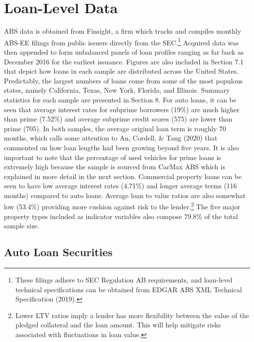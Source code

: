 \documentclass[10.5pt]{article}
\begin{document}
\section{Loan-Level Data}

ABS data is obtained from Finsight, a firm which tracks and compiles monthly ABS-EE filings from public issuers directly from the SEC.\footnote{These filings adhere to SEC Regulation AB requirements, and loan-level technical specifications can be obtained from EDGAR ABS XML Technical Specification (2019).} Acquired data was then appended to form unbalanced panels of loan profiles ranging as far back as December 2016 for the earliest issuance. Figures are also included in Section 7.1 that depict how loans in each sample are distributed across the United States. Predictably, the largest numbers of loans come from some of the most populous states, namely California, Texas, New York, Florida, and Illinois. Summary statistics for each sample are presented in Section 8. For auto loans, it can be seen that average interest rates for subprime borrowers (19\%) are much higher than prime (7.52\%) and average subprime credit scores (575) are lower than prime (705). In both samples, the average original loan term is roughly 70 months, which calls some attention to An, Cordell, \& Tang (2020) that commented on how loan lengths had been growing beyond five years. It is also important to note that the percentage of used vehicles for prime loans is extremely high because the sample is sourced from CarMax ABS which is explained in more detail in the next section. Commercial property loans can be seen to have low average interest rates (4.71\%) and longer average terms (116 months) compared to auto loans. Average loan to value ratios are also somewhat low (53.4\%) providing more cushion against risk to the lender.\footnote{Lower LTV ratios imply a lender has more flexibility between the value of the pledged collateral and the loan amount. This will help mitigate risks associated with fluctuations in loan value.} The five major property types included as indicator variables also compose 79.8\% of the total sample size. 

\subsection{Auto Loan Securities}
\end{document}
